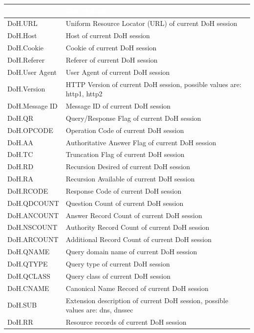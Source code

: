 \begin{longtable}{p{}|p{}}   
    \rowcolor{black}\multicolumn{1}{l!\vlinewhite}{\textcolor{white}{Field}}  & \textcolor{white}{Description} \\\hline
    DoH.URL &	Uniform Resource Locator (URL) of current DoH session \\\hline
    DoH.Host &	Host of current DoH session \\\hline
    DoH.Cookie &	Cookie of current DoH session \\\hline
    DoH.Referer &	Referer of current DoH session \\\hline
    DoH.User Agent &	User Agent of current DoH session \\\hline
    DoH.Version &	HTTP Version of current DoH session, possible values are: http1, http2 \\\hline
    DoH.Message ID &	Message ID of current DoH session \\\hline
    DoH.QR &	Query/Response Flag of current DoH session \\\hline
    DoH.OPCODE &	Operation Code of current DoH session \\\hline
    DoH.AA &	Authoritative Answer Flag of current DoH session \\\hline
    DoH.TC &	Truncation Flag of current DoH session \\\hline
    DoH.RD &	Recursion Desired of current DoH session \\\hline
    DoH.RA &	Recursion Available of current DoH session \\\hline
    DoH.RCODE &	Response Code of current DoH session \\\hline
    DoH.QDCOUNT &	Question Count of current DoH session \\\hline
    DoH.ANCOUNT &	Answer Record Count of current DoH session \\\hline
    DoH.NSCOUNT &	Authority Record Count of current DoH session \\\hline
    DoH.ARCOUNT &	Additional Record Count of current DoH session \\\hline
    DoH.QNAME &	Query domain name of current DoH session \\\hline
    DoH.QTYPE &	Query type of current DoH session \\\hline
    DoH.QCLASS &	Query class of current DoH session \\\hline
    DoH.CNAME &	Canonical Name Record of current DoH session \\\hline
    DoH.SUB &	Extension description of current DoH session, possible values are: dns, dnssec \\\hline
    DoH.RR &	Resource records of current DoH session \\\hline    
\end{longtable} 

